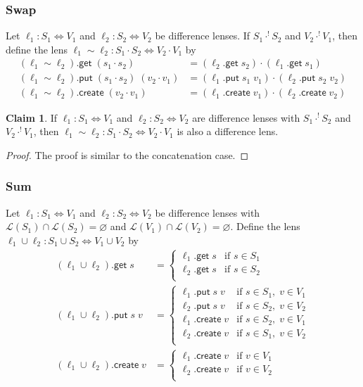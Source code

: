 \documentclass[acmsmall,review,anonymous]{acmart}\settopmatter{printfolios=true,printccs=false,printacmref=false}
\theoremstyle{definition}
\newtheorem{claim}{Claim}
\newcommand{\kw}[1]{\ensuremath{\mathsf{#1}}\xspace}
\newcommand{\get}{\ensuremath{\kw{get}}\xspace}
\newcommand{\pput}{\ensuremath{\kw{put}}\xspace}
\newcommand{\create}{\ensuremath{\kw{create}}\xspace}
\begin{document}
\subsubsection{Swap}
Let $\ell_1 : S_1 \Leftrightarrow V_1$ and $\ell_2 : S_2 \Leftrightarrow V_2$ be difference
lenses. If $S_1 \cdot^{!} S_2$ and $V_2 \cdot^{!} V_1$, then define the lens $\ell_1 \sim \ell_2 : S_1 \cdot S_2 \Leftrightarrow
V_2 \cdot V_1$ by
\begin{align*}
(\ell_1 \sim \ell_2).\get \; (s_1 \cdot s_2) &= (\ell_2.\get \; s_2) \cdot (\ell_1.\get \; s_1)\\
(\ell_1 \sim \ell_2).\pput \; (s_1 \cdot s_2) \; (v_2 \cdot v_1) &= (\ell_1.\pput \; s_1
\; v_1) \cdot (\ell_2.\pput \; s_2 \; v_2)\\
(\ell_1 \sim \ell_2).\create \; (v_2 \cdot v_1) &= (\ell_1.\create \; v_1) \cdot (\ell_2.\create \; v_2)
\end{align*}
\begin{claim}\label{productislens}
If $\ell_1 :S_1 \Leftrightarrow V_1$ and $\ell_2 : S_2 \Leftrightarrow V_2$ are difference lenses with $S_1 \cdot^{!} S_2$ and $V_2 \cdot^{!} V_1$, then
$\ell_1 \sim \ell_2  : S_1 \cdot S_2 \Leftrightarrow V_2 \cdot V_1$ is also a difference lens.
\end{claim}
\begin{proof}
The proof is similar to the concatenation case.
\end{proof}
\subsubsection{Sum}
Let $\ell_1 : S_1 \Leftrightarrow V_1$ and $\ell_2 : S_2 \Leftrightarrow V_2$ be
difference lenses with $\mathcal{L}(S_1) \cap \mathcal{L}(S_2) = \varnothing$ and $\mathcal{L}(V_1) \cap \mathcal{L}(V_2) = \varnothing$. Define the lens
$\ell_1 \cup \ell_2 :
S_1 \cup S_2 \Leftrightarrow V_1 \cup V_2$ by
\begin{align*}
(\ell_1 \cup \ell_2).\get \; s &=
\begin{cases}
\ell_1.\get \; s & \text{if } s \in S_1\\
\ell_2.\get \; s & \text{if } s \in S_2\\
\end{cases}\\
(\ell_1 \cup \ell_2).\pput \; s \; v&=
\begin{cases}
\ell_1.\pput \; s \; v& \text{if } s \in S_1, \; v \in V_1\\
\ell_2.\pput \; s \; v& \text{if } s \in S_2, \; v \in V_2\\
\ell_1.\create \; v & \text{if } s \in S_2, \; v \in V_1\\
\ell_2.\create \; v & \text{if } s \in S_1, \; v \in V_2\\
\end{cases}\\
(\ell_1 \cup \ell_2).\create \; v &=
\begin{cases}
\ell_1.\create \; v & \text{if } v \in V_1\\
\ell_2.\create \; v & \text{if } v \in V_2\\
\end{cases}
\end{align*}
\end{document}
